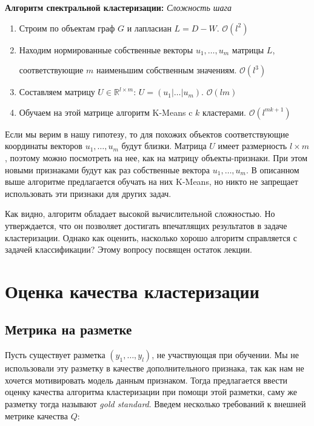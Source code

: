 \documentclass[12pt,fleqn]{article}
\begin{document}
{\bf Алгоритм спектральной кластеризации:}
\null\hfill {\it Сложность шага}
\begin{enumerate}
    \item Строим по объектам граф $G$ и лапласиан $L = D - W$.
    \null\hfill $\mathcal{O}(l^2)$
    \item Находим нормированные собственные векторы $u_1, \dots, u_m$ матрицы $L$, \par соответствующие $m$ наименьшим собственным значениям.  \null\hfill $\mathcal{O}(l^3)$
    \item Составляем матрицу $U \in \mathbb R^{l \times m}$:
    $U = (u_1 | \dots | u_m)$.
    \null\hfill$\mathcal{O}(lm)$
    \item Обучаем на этой матрице алгоритм K-Means c $k$ кластерами.
   \null\hfill$\mathcal{O}(l^{mk+1})$
\end{enumerate}

Если мы верим в нашу гипотезу, то для похожих объектов соответствующие координаты векторов $u_1, \dots, u_m$ будут близки. Матрица $U$ имеет размерность $l\times m$, поэтому можно посмотреть на нее, как на матрицу объекты-признаки. При этом новыми признаками будут как раз собственные вектора $u_1, \dots, u_m$. В описанном выше алгоритме предлагается обучать на них K-Means, но никто не запрещает использовать эти признаки для других задач.

Как видно, алгоритм обладает высокой вычислительной сложностью. Но утверждается, что он позволяет достигать впечатлящих результатов в задаче кластеризации. Однако как оценить, насколько хорошо алгоритм справляется с задачей классификации? Этому вопросу посвящен остаток лекции.

\section{Оценка качества кластеризации}

\subsection{Метрика на разметке}

Пусть существует разметка $(y_1, \dots, y_l)$, не участвующая при обучении. Мы не использовали эту разметку в качестве дополнительного признака, так как нам не хочется мотивировать модель данным признаком. Тогда предлагается ввести оценку качества алгоритма кластеризации при помощи этой разметки, саму же разметку тогда называют {\it gold standard}. Введем несколько требований к внешней метрике качества $Q$:
\end{document}
